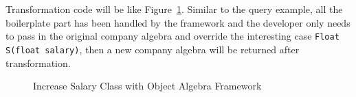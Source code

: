 Transformation code will be like Figure~\ref{transform_with_oaframework}. Similar to the query example, all the boilerplate part has been handled by the framework and the developer only needs to pass in the original company algebra and override the interesting case \lstinline{Float S(float salary)}, then a new company algebra will be returned after transformation.  
\begin{figure}[tb]
\vspace{-.1in}
\caption{Increase Salary Class with Object Algebra Framework}
\label{transform_with_oaframework}
\end{figure}

